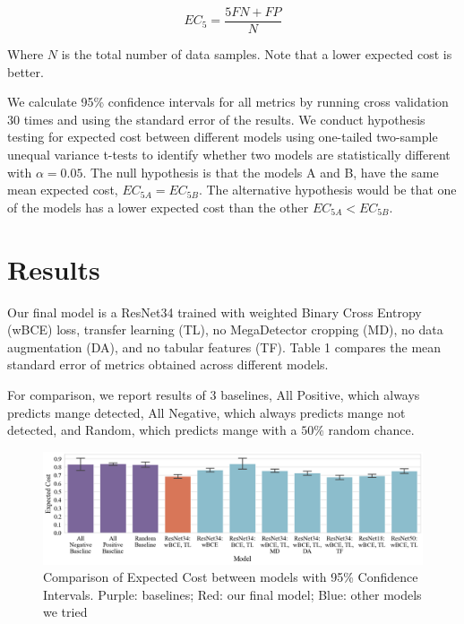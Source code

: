 \documentclass{article}
\begin{document}
\begin{equation}
  EC_5 = \frac{5FN + FP}{N}
\end{equation}

Where $N$ is the total number of data samples. Note that a lower expected cost is better.

We calculate 95\% confidence intervals for all metrics by running cross validation 30 times and using the standard error of the results. We conduct hypothesis testing for expected cost between different models using one-tailed two-sample unequal variance t-tests to identify whether two models are statistically different with $\alpha = 0.05$. The null hypothesis is that the models A and B, have the same mean expected cost, $EC_{5A} = EC_{5B}$. The alternative hypothesis would be that one of the models has a lower expected cost than the other $EC_{5A} < EC_{5B}$.

\section{Results} \label{sec:results}

Our final model is a ResNet34 trained with weighted Binary Cross Entropy (wBCE) loss, transfer learning (TL), no MegaDetector cropping (MD), no data augmentation (DA), and no tabular features (TF). 
Table 1 compares the mean standard error of metrics obtained across different models.

For comparison, we report results of 3 baselines,
All Positive, which always predicts mange detected,
All Negative, which always predicts mange not detected, and 
Random, which predicts mange with a $50\%$ random chance.

\begin{figure}[H]
  \centering
  \includegraphics[width=\textwidth]{fig4.png}
  \caption{\label{fig:fig4}Comparison of Expected Cost between models with 95\% Confidence Intervals. 
  Purple: baselines; Red: our final model; Blue: other models we tried}
\end{figure}
\end{document}
